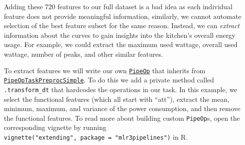 Adding these 720 features to our full dataset is a bad idea as each
individual feature does not provide meaningful information, similarly,
we cannot automate selection of the best feature subset for the same
reason. Instead, we can \emph{extract} information about the curves to
gain insights into the kitchen's overall energy usage. For example, we
could extract the maximum used wattage, overall used wattage, number of
peaks, and other similar features.

To extract features we will write our own
\href{https://mlr3pipelines.mlr-org.com/reference/PipeOp.html}{\texttt{PipeOp}}
that inherits from
\href{https://mlr3pipelines.mlr-org.com/reference/PipeOpTaskPreprocSimple.html}{\texttt{PipeOpTaskPreprocSimple}}.
To do this we add a private method called \texttt{.transform\_dt} that
hardcodes the operations in our task. In this example, we select the
functional features (which all start with ``att''), extract the mean,
minimum, maximum, and variance of the power consumption, and then remove
the functional features. To read more about building custom
\texttt{PipeOp}s, open the corresponding vignette by running
\texttt{vignette("extending",\ package\ =\ "mlr3pipelines")} in R.

\begin{Shaded}
\begin{Highlighting}[]
\OtherTok{=}\SpecialCharTok{::}\NormalTok{(}\NormalTok{,}
  \SpecialCharTok{::}
   \NormalTok{(}
     
\OtherTok{=} \NormalTok{(}\NormalTok{, }\SpecialCharTok{:}\NormalTok{)}
\OtherTok{=}
\NormalTok{        dt[, energy\_means }\SpecialCharTok{:}\ErrorTok{=} \NormalTok{, mean)]}
\NormalTok{        dt[, energy\_mins }\SpecialCharTok{:}\ErrorTok{=} \NormalTok{, min)]}
\NormalTok{        dt[, energy\_maxs }\SpecialCharTok{:}\ErrorTok{=} \NormalTok{, max)]}
\NormalTok{        dt[, energy\_vars }\SpecialCharTok{:}\ErrorTok{=} \NormalTok{, var)]}
\NormalTok{        dt[, (ffeat\_names) }\SpecialCharTok{:}\ErrorTok{=} \NormalTok{]}
\NormalTok{    \}}
\NormalTok{  )}
\NormalTok{)}
\end{Highlighting}
\end{Shaded}


